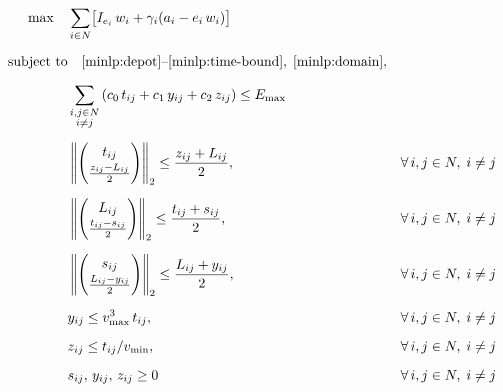 \documentclass[11pt]{article}
\begin{document}
\begin{align}
\max \quad & \sum_{i \in N} \bigl[ I_{e_i}\, w_i + \gamma_i (a_i - e_i\, w_i) \bigr] \label{misocp:obj} \\[6pt]
\text{subject to} & \quad \eqref{minlp:depot}\text{--}\eqref{minlp:time-bound},\; \eqref{minlp:domain}, \notag \\[6pt]
& \sum_{\substack{i,j \in N  \\ i \neq j}} \left( c_0\, t_{ij} + c_1\, y_{ij} + c_2\, z_{ij} \right) \le E_{\max} \label{misocp:energy} \\[6pt]
& \left\lVert
    \begin{pmatrix}
        t_{ij} \\[2pt]
        \frac{z_{ij}-L_{ij}}{2}
    \end{pmatrix}
 \right\rVert_2
 \le \frac{z_{ij}+L_{ij}}{2}, && \forall\, i,j \in N,\; i \neq j \label{misocp:cone-z} \\[6pt]
& \left\lVert
    \begin{pmatrix}
        L_{ij} \\[2pt]
        \frac{t_{ij}-s_{ij}}{2}
    \end{pmatrix}
 \right\rVert_2
 \le \frac{t_{ij}+s_{ij}}{2}, && \forall\, i,j \in N,\; i \neq j \label{misocp:cone-s} \\[6pt]
& \left\lVert
    \begin{pmatrix}
        s_{ij} \\[2pt]
        \frac{L_{ij}-y_{ij}}{2}
    \end{pmatrix}
 \right\rVert_2
 \le \frac{L_{ij}+y_{ij}}{2}, && \forall\, i,j \in N,\; i \neq j \label{misocp:cone-y} \\[6pt]
& y_{ij} \leq v_{\max}^3\, t_{ij},
    && \forall\, i,j \in N,\; i \neq j \label{misocp:y-bound} \\[6pt]
& z_{ij} \leq t_{ij} / v_{\min},
    && \forall\, i,j \in N,\; i \neq j \label{misocp:z-bound} \\[6pt]
&  s_{ij},\, y_{ij},\, z_{ij} \ge 0 && \forall\, i,j \in N,\; i \neq j \notag
\end{align}
\end{document}
